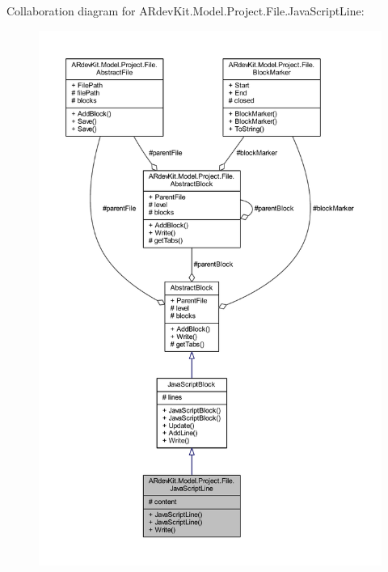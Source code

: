 Collaboration diagram for A\-Rdev\-Kit.\-Model.\-Project.\-File.\-Java\-Script\-Line\-:
\nopagebreak
\begin{figure}[H]
\begin{center}
\leavevmode
\includegraphics[width=350pt]{class_a_rdev_kit_1_1_model_1_1_project_1_1_file_1_1_java_script_line__coll__graph}
\end{center}
\end{figure}
